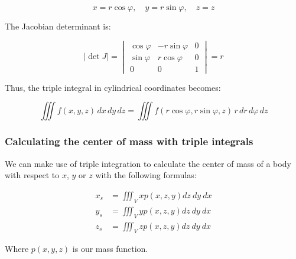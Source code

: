 \[
    x = r \cos \varphi, \quad y = r \sin \varphi, \quad z = z
\]

The Jacobian determinant is:

\[
    \left| \det J \right| =
    \begin{vmatrix}
    \cos \varphi & -r \sin \varphi & 0 \\
    \sin \varphi & r \cos \varphi & 0 \\
    0 & 0 & 1
    \end{vmatrix}
    = r
\]

Thus, the triple integral in cylindrical coordinates becomes:

\[
    \iiint f(x, y, z)\, dx\, dy\, dz = \iiint f(r \cos \varphi, r \sin \varphi, z)\, r\, dr\, d\varphi\, dz
\]

\subsubsection{Calculating the center of mass with triple integrals}

We can make use of triple integration to calculate the center of mass of a body with
respect to \(x\), \(y\) or \(z\) with the following formulas:

\begin{align*}
    x_s &= \iiint_V xp(x,z,y)dz\ dy \ dx\\
    y_s &= \iiint_V yp(x,z,y)dz\ dy \ dx\\
    z_s &= \iiint_V zp(x,z,y)dz\ dy \ dx
\end{align*}

Where \(p(x,y,z)\) is our mass function.
